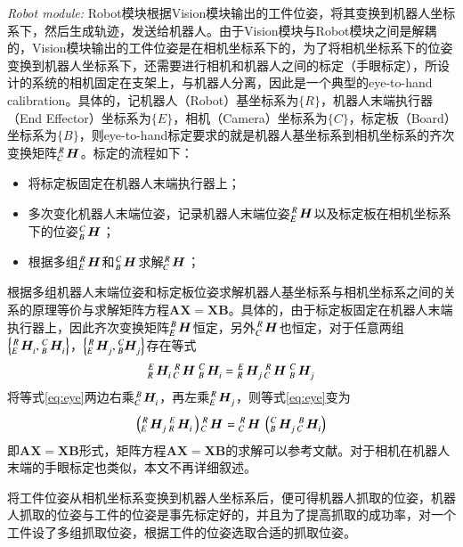 \emph{Robot module:}
Robot模块根据Vision模块输出的工件位姿，将其变换到机器人坐标系下，然后生成轨迹，发送给机器人。由于Vision模块与Robot模块之间是解耦的，Vision模块输出的工件位姿是在相机坐标系下的，为了将相机坐标系下的位姿变换到机器人坐标系下，还需要进行相机和机器人之间的标定（手眼标定），所设计的系统的相机固定在支架上，与机器人分离，因此是一个典型的eye-to-hand calibration。具体的，记机器人（Robot）基坐标系为$\{R\}$，机器人末端执行器（End Effector）坐标系为$\{E\}$，相机（Camera）坐标系为$\{C\}$，标定板（Board）坐标系为$\{B\}$，则eye-to-hand标定要求的就是机器人基坐标系到相机坐标系的齐次变换矩阵$\tensor*[^R_C]{\,\bm{H}}{}$。标定的流程如下：
\begin{itemize}
\item 将标定板固定在机器人末端执行器上；
\item 多次变化机器人末端位姿，记录机器人末端位姿$\tensor*[^R_E]{\,\bm{H}}{}$以及标定板在相机坐标系下的位姿$\tensor*[^C_B]{\,\bm{H}}{}$；
\item 根据多组$\tensor*[^R_E]{\,\bm{H}}{}$和$\tensor*[^C_B]{\,\bm{H}}{}$求解$\tensor*[^R_C]{\,\bm{H}}{}$；
\end{itemize}
根据多组机器人末端位姿和标定板位姿求解机器人基坐标系与相机坐标系之间的关系的原理等价与求解矩阵方程$\bm{A}\bm{X}=\bm{X}\bm{B}$。具体的，由于标定板固定在机器人末端执行器上，因此齐次变换矩阵$\tensor*[^B_E]{\,\bm{H}}{}$恒定，另外$\tensor*[^R_C]{\,\bm{H}}{}$也恒定，对于任意两组$\left\{\tensor*[^R_E]{\,\bm{H}}{_i},\tensor*[^C_B]{\,\bm{H}}{_i}\right\}$，$\left\{\tensor*[^R_E]{\,\bm{H}}{_j},\tensor*[^C_B]{\bm{H}}{_j}\right\}$存在等式
\begin{equation}
  \label{eq:eye}
  \tensor*[^E_R]{\,\bm{H}}{_i} \, \tensor*[^R_C]{\,\bm{H}}{} \, \tensor*[^C_B]{\,\bm{H}}{_i} = \tensor*[^E_R]{\,\bm{H}}{_j} \, \tensor*[^R_C]{\,\bm{H}}{} \, \tensor*[^C_B]{\,\bm{H}}{_j}
\end{equation}
将等式\ref{eq:eye}两边右乘$\tensor*[^B_C]{\,\bm{H}}{_i}$，再左乘$\tensor*[^R_E]{\,\bm{H}}{_j}$，则等式\ref{eq:eye}变为
\begin{equation}
  \label{eq:eye}
  \left(\tensor*[^R_E]{\,\bm{H}}{_j} \, \tensor*[^E_R]{\,\bm{H}}{_i} \,\right) \tensor*[^R_C]{\,\bm{H}}{} = \tensor*[^R_C]{\,\bm{H}}{} \, \left(\tensor*[^C_B]{\,\bm{H}}{_j} \, \tensor*[^B_C]{\,\bm{H}}{_i}\right)
\end{equation}
即$\bm{A}\bm{X}=\bm{X}\bm{B}$形式，矩阵方程$\bm{A}\bm{X}=\bm{X}\bm{B}$的求解可以参考文献\cite{daniilidis1999hand}。对于相机在机器人末端的手眼标定也类似，本文不再详细叙述。


将工件位姿从相机坐标系变换到机器人坐标系后，便可得机器人抓取的位姿，机器人抓取的位姿与工件的位姿是事先标定好的，并且为了提高抓取的成功率，对一个工件设了多组抓取位姿，根据工件的位姿选取合适的抓取位姿。

